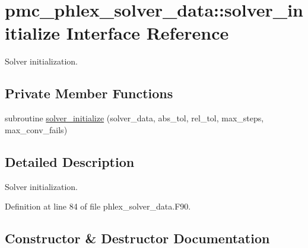 \hypertarget{interfacepmc__phlex__solver__data_1_1solver__initialize}{}\section{pmc\+\_\+phlex\+\_\+solver\+\_\+data\+:\+:solver\+\_\+initialize Interface Reference}
\label{interfacepmc__phlex__solver__data_1_1solver__initialize}


Solver initialization.  


\subsection*{Private Member Functions}
\begin{DoxyCompactItemize}
\item 
subroutine \mbox{\hyperlink{interfacepmc__phlex__solver__data_1_1solver__initialize_a6c704132754e2482588d75e988f62163}{solver\+\_\+initialize}} (solver\+\_\+data, abs\+\_\+tol, rel\+\_\+tol, max\+\_\+steps, max\+\_\+conv\+\_\+fails)
\end{DoxyCompactItemize}


\subsection{Detailed Description}
Solver initialization. 

Definition at line 84 of file phlex\+\_\+solver\+\_\+data.\+F90.



\subsection{Constructor \& Destructor Documentation}
\mbox{\label{interfacepmc__phlex__solver__data_1_1solver__initialize_a6c704132754e2482588d75e988f62163}} 
